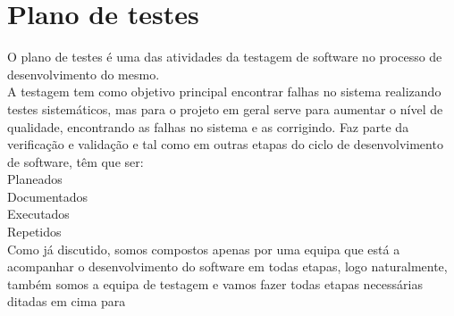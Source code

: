 \chapter{Plano de testes}
\label{plano_de_testes}
O plano de testes é uma das atividades da testagem de software no processo de desenvolvimento do mesmo.\\
 A testagem tem como objetivo principal encontrar falhas no sistema realizando testes sistemáticos, mas para o projeto em geral serve para aumentar o nível de qualidade,  encontrando as falhas no sistema e as corrigindo. Faz parte da verificação e validação e tal como em outras etapas do ciclo de desenvolvimento de software, têm que ser:\\ Planeados\\
 Documentados\\
 Executados\\
 Repetidos\\
Como já discutido, somos compostos apenas por uma equipa que está a acompanhar o desenvolvimento do software em todas etapas, logo naturalmente, também somos a equipa de testagem e vamos fazer todas etapas necessárias ditadas em cima para 